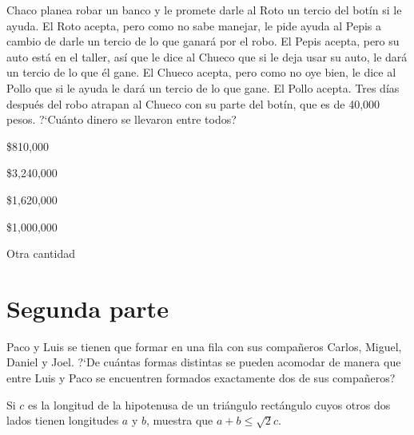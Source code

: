 \begin{Problema}{10}
  Chaco planea robar un banco y le promete darle al Roto un tercio del
  bot\'in si le ayuda. El Roto acepta, pero como no sabe manejar, le
  pide ayuda al Pepis a cambio de darle un tercio de lo que ganar\'a
  por el robo. El Pepis acepta, pero su auto est\'a en el taller,
  as\'i que le dice al Chueco que si le deja usar su auto, le dar\'a
  un tercio de lo que \'el gane. El Chueco acepta, pero como no oye
  bien, le dice al Pollo que si le ayuda le dar\'a un tercio de lo que
  gane. El Pollo acepta. Tres d\'ias despu\'es del robo atrapan al
  Chueco con su parte del bot\'in, que es de 40,000 pesos.  ?`Cu\'anto
  dinero se llevaron entre todos?

  \begin{inparaenum}
  \item \$810,000 \quad\quad
  \item \$3,240,000 \quad\quad
  \item \$1,620,000 \quad\quad
  \item \$1,000,000 \quad\quad 
  \item Otra cantidad
  \end{inparaenum}
\end{Problema}

\begin{Solucion}
  
\end{Solucion}

\section{Segunda parte}
\label{sec:segunda-parte2012}

\begin{Problema}{11}
  Paco y Luis se tienen que formar en una fila con sus compa\~neros
  Carlos, Miguel, Daniel y Joel. ?`De cu\'antas formas distintas se
  pueden acomodar de manera que entre Luis y Paco se encuentren
  formados exactamente dos de sus compa\~neros?
\end{Problema}

\begin{Solucion}
  
\end{Solucion}

\begin{Problema}{12}
  Si $c$ es la longitud de la hipotenusa de un tri\'angulo
  rect\'angulo cuyos otros dos lados tienen longitudes $a$ y $b$,
  muestra que $a+b\leq\sqrt{2}c$.
\end{Problema}


